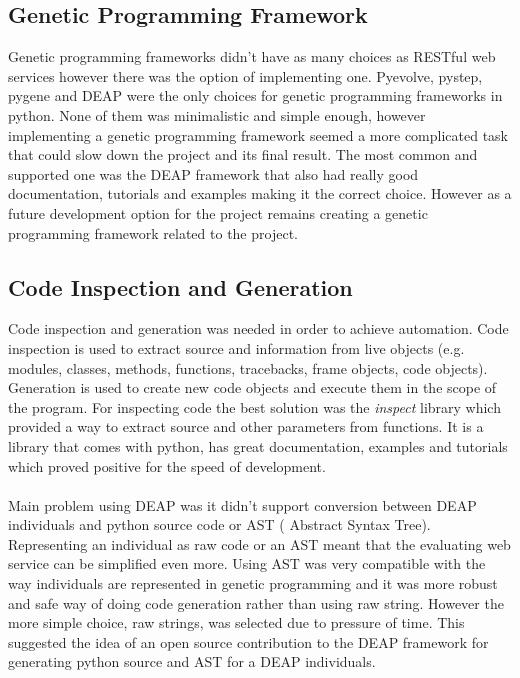 \subsection{Genetic Programming Framework}
Genetic programming frameworks didn't have as many choices as RESTful web services however there was the option of implementing one.  Pyevolve\cite{pyevolve}, pystep\cite{pystep}, pygene\cite{pygene} and DEAP\cite{deap} were 
the only choices for genetic programming frameworks in python. None of them was minimalistic and simple enough, however implementing a genetic programming framework seemed a more complicated task
that could slow down the project and its final result. The most common and supported one was
the DEAP framework that also had really good documentation, tutorials and examples making it the correct choice. However as a future development option for the project
remains creating a genetic programming framework related to the project.
\subsection{Code Inspection and Generation}
Code inspection and generation was needed in order to achieve automation. Code inspection is used to extract source and information from live objects (e.g. modules, classes, methods, functions, tracebacks, 
frame objects, code objects). Generation is used to create new code objects and execute them in the scope of the program.
For inspecting code the best solution was the \textit{inspect} library which provided a way to extract source and other parameters from functions. It is a library that comes with python, 
has great documentation, examples and tutorials which proved positive for the speed of development.
\paragraph{}
Main problem using DEAP was it didn't support conversion between DEAP individuals and python source code or AST ( Abstract Syntax Tree). Representing an individual as raw code or an AST meant that 
the evaluating web service can be simplified even more. Using AST was very compatible with the way individuals are represented in genetic programming and it was more
robust and safe way of doing code generation rather than using raw string. However the more simple choice, raw strings, was selected due to pressure of time.  This suggested the idea of an open source contribution to the DEAP framework
 for generating python source 
and AST for a DEAP individuals.
